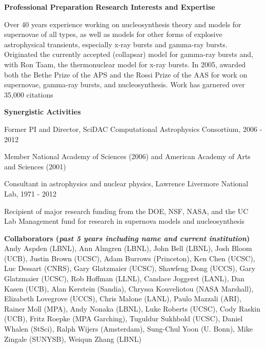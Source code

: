 \documentclass[12pt,letterpaper,english]{article}
\begin{document}
\begin{flushleft} {\bf Professional Preparation}
\vspace{-6pt}
{\bf Research Interests and Expertise}
{\parindent 16pt


Over 40 years experience working on nucleosynthesis theory and models
for supernovae of all types, as well as models for other forms of explosive
astrophysical transients, especially x-ray bursts and gamma-ray
bursts. Originated the currently accepted (collapsar) model for
gamma-ray bursts and, with Ron Taam, the thermonuclear model for x-ray
bursts. In 2005, awarded both the Bethe Prize of the APS and the Rossi
Prize of the AAS for work on supernovae, gamma-ray bursts, and
nucleosynthesis. Work has garnered over 35,000 citations
}

\newpage

\vspace{.04in}
{\bf Synergistic Activities}
\vspace{-6pt}
\begin{enumerate*} 
\item Former PI and Director, SciDAC Computational Astrophysics
Consortium, 2006 - 2012 \\ 
\item Member National Academy of Sciences (2006) and
American Academy of Arts and Sciences (2001) \\ 
\item Consultant in astrophysics and nuclear physics, Lawrence
Livermore National Lab, 1971 - 2012 \\ 
\item  Recipient of major research funding from the DOE, NSF, NASA,
and the UC Lab Management fund for research in supernova models and
nucleosynthesis \\ 
\end{enumerate*} 

\vspace{-6pt} {\bf Collaborators ({\emph{past 5 years including name
      and current institution}})} {\parindent 16pt Andy Aspden (LBNL),
  Ann Almgren (LBNL), John Bell (LBNL), Josh Bloom (UCB), Justin Brown
  (UCSC), Adam Burrows (Princeton), Ken Chen (UCSC), Luc Dessart
  (CNRS), Gary Glatzmaier (UCSC), Shawfeng Dong (UCCS), Gary
  Glatzmaier (UCSC), Rob Hoffman (LLNL), Candace Joggerst (LANL), Dan
  Kasen (UCB), Alan Kerstein (Sandia), Chryssa Kouveliotou (NASA
  Marshall), Elizabeth Lovegrove (UCCS), Chris Malone (LANL), Paulo
  Mazzali (ARI), Rainer Moll (MPA), Andy Nonaka (LBNL), Luke Roberts
  (UCSC), Cody Raskin (UCB), Fritz Roepke (MPA Garching), Tuguldur
  Sukhbold (UCSC), Daniel Whalen (StSci), Ralph Wijers (Amsterdam),
  Sung-Chul Yoon (U. Bonn), Mike Zingale (SUNYSB), Weiqun Zhang (LBNL)
}
\end{flushleft}
\end{document}
